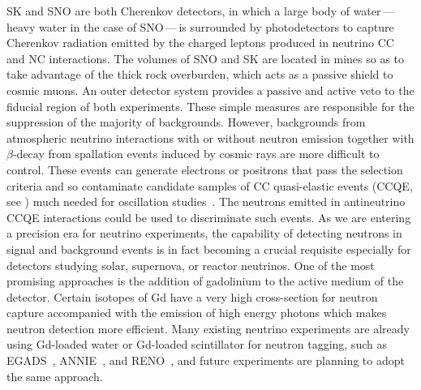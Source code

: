 SK and SNO are both Cherenkov detectors, in which a large body of water\,---\,heavy water in the case of SNO\,---\,is surrounded by %
photodetectors to capture Cherenkov radiation emitted by the charged leptons produced in neutrino CC and NC interactions.
The volumes of SNO and SK are located in mines so as to take advantage of the thick rock overburden, %
which acts as a passive shield to cosmic muons.
An outer detector system provides a passive and active veto to the fiducial region of both experiments.
These simple measures are responsible for the suppression of the majority of backgrounds.
However, backgrounds from atmospheric neutrino interactions with or without neutron emission together %
with $\beta$-decay from spallation events induced by cosmic rays are more difficult to control.
These events can generate electrons or positrons that pass the selection criteria and so contaminate %
candidate samples of CC quasi-elastic events (CCQE, see ) %
much needed for oscillation studies~\cite{Zhang:2013tua, Super-Kamiokande:2015xra}. %
The neutrons emitted in antineutrino CCQE interactions could be used to discriminate such events.  %
As we are entering a precision era for neutrino experiments, the capability of detecting neutrons %
in signal and background events is in fact becoming a crucial requisite %
especially for detectors studying solar, supernova, or reactor neutrinos.
One of the most promising approaches is the addition of gadolinium to the active medium of the detector.
Certain isotopes of Gd have a very high cross-section for neutron capture %
accompanied with the emission of high energy photons which makes neutron detection more efficient.
Many existing neutrino experiments are already using Gd-loaded water or Gd-loaded scintillator for neutron tagging, %
such as EGADS~\cite{Ikeda:2019pcm}, ANNIE~\cite{Back:2019aqi}, and RENO~\cite{Ahn:2010vy}, %
and future experiments are planning to adopt the same approach.

